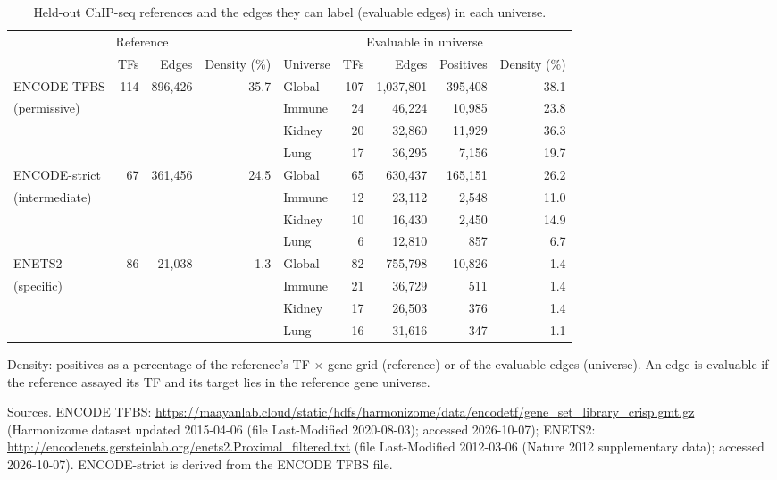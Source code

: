 \documentclass[11pt,a4paper]{article}
\begin{document}
\begin{table}[tbp]
\centering
\small
\setlength{\tabcolsep}{4pt}
\caption{Held-out ChIP-seq references and the edges they can label (evaluable edges) in each universe.}
\label{tab:chip}
\begin{tabular}{@{}lrrrlrrrr@{}}
\toprule
\multicolumn{4}{c}{Reference} & \multicolumn{5}{c}{Evaluable in universe} \\
\cmidrule(lr){1-4}\cmidrule(lr){5-9}
 & TFs & Edges & Density (\%) & Universe & TFs & Edges & Positives & Density (\%) \\
\midrule
ENCODE TFBS & 114 & 896{,}426 & 35.7 & Global & 107 & 1{,}037{,}801 & 395{,}408 & 38.1 \\
{\footnotesize (permissive)} &  &  &  & Immune & 24 & 46{,}224 & 10{,}985 & 23.8 \\
 &  &  &  & Kidney & 20 & 32{,}860 & 11{,}929 & 36.3 \\
 &  &  &  & Lung & 17 & 36{,}295 & 7{,}156 & 19.7 \\
\addlinespace[2pt]
ENCODE-strict & 67 & 361{,}456 & 24.5 & Global & 65 & 630{,}437 & 165{,}151 & 26.2 \\
{\footnotesize (intermediate)} &  &  &  & Immune & 12 & 23{,}112 & 2{,}548 & 11.0 \\
 &  &  &  & Kidney & 10 & 16{,}430 & 2{,}450 & 14.9 \\
 &  &  &  & Lung & 6 & 12{,}810 & 857 & 6.7 \\
\addlinespace[2pt]
ENETS2 & 86 & 21{,}038 & 1.3 & Global & 82 & 755{,}798 & 10{,}826 & 1.4 \\
{\footnotesize (specific)} &  &  &  & Immune & 21 & 36{,}729 & 511 & 1.4 \\
 &  &  &  & Kidney & 17 & 26{,}503 & 376 & 1.4 \\
 &  &  &  & Lung & 16 & 31{,}616 & 347 & 1.1 \\
\bottomrule
\end{tabular}
\par\smallskip
\begin{minipage}{\linewidth}\footnotesize
Density: positives as a percentage of the reference's TF $\times$ gene grid (reference) or of the evaluable edges (universe). An edge is evaluable if the reference assayed its TF and its target lies in the reference gene universe.

Sources. ENCODE TFBS: \url{https://maayanlab.cloud/static/hdfs/harmonizome/data/encodetf/gene_set_library_crisp.gmt.gz} (Harmonizome dataset updated 2015-04-06 (file Last-Modified 2020-08-03); accessed 2026-10-07); ENETS2: \url{http://encodenets.gersteinlab.org/enets2.Proximal_filtered.txt} (file Last-Modified 2012-03-06 (Nature 2012 supplementary data); accessed 2026-10-07). ENCODE-strict is derived from the ENCODE TFBS file.
\end{minipage}
\end{table}
\end{document}
